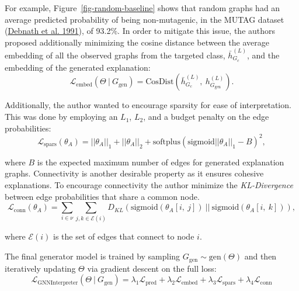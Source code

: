 \documentclass[
  11pt,
  letterpaper,
]{article}
\begin{document}
For example, Figure~\ref{fig-random-baseline} shows that random graphs
had an average predicted probability of being non-mutagenic, in the
MUTAG dataset (\protect\hyperlink{ref-Debnath_1991}{Debnath et al.
1991}), of 93.2\%. In order to mitigate this issue, the authors proposed
additionally minimizing the cosine distance between the average
embedding of all the observed graphs from the targeted class,
\(\bar h^{(L)}_{G_c}\), and the embedding of the generated explanation:
\begin{equation} \label{l-embed}
    \mathcal{L}_{\text{embed}}(\Theta \ | \ G_\text{gen}) = \text{CosDist}\left( \bar h^{(L)}_{G_c}, \ h^{(L)}_{G_\text{gen}} \right). 
\end{equation}

Additionally, the author wanted to encourage sparsity for ease of
interpretation. This was done by employing an \(L_1\), \(L_2\), and a
budget penalty on the edge probabilities:\\
\begin{equation} \label{l-spars}
    \mathcal{L}_{\text{spars}}(\theta_A) = ||\theta_A||_1 + ||\theta_A||_2 + \text{softplus}(\text{sigmoid}||\theta_A||_1 - B)^2, 
\end{equation}

where \(B\) is the expected maximum number of edges for generated
explanation graphs. Connectivity is another desirable property as it
ensures cohesive explanations. To encourage connectivity the author
minimize the \emph{KL-Divergence} between edge probabilities that share
a common node. \begin{equation}
    \mathcal{L}_{\text{conn}}(\theta_A) = \sum_{i \in \nu} \sum_{j, k \in \mathcal{E}(i)} D_{KL}(\text{sigmoid}(\theta_A[i, \ j]) \ || \ \text{sigmoid}(\theta_A[i, \ k])), 
\end{equation}

where \(\mathcal{E}(i)\) is the set of edges that connect to node \(i\).

\quad The final generator model is trained by sampling
\(G_\text{gen} \sim \text{gen}(\Theta)\) and then iteratively updating
\(\Theta\) via gradient descent on the full loss: \begin{equation}
    \mathcal{L}_{\text{GNNInterpreter}}(\Theta \ | \ G_\text{gen}) = 
    \lambda_1 \mathcal{L}_{\text{pred}} + 
    \lambda_2 \mathcal{L}_{\text{embed}} + 
    \lambda_3 \mathcal{L}_{\text{spars}} +
    \lambda_4 \mathcal{L}_{\text{conn}} 
\end{equation}
\end{document}
